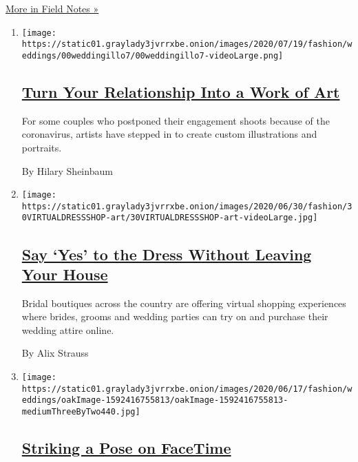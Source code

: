 \href{/column/field-notes}{More in Field Notes »}

\begin{enumerate}
\def\labelenumi{\arabic{enumi}.}
\item
  \texttt{[image: https://static01.graylady3jvrrxbe.onion/images/2020/07/19/fashion/weddings/00weddingillo7/00weddingillo7-videoLarge.png]}

  \hypertarget{turn-your-relationship-into-a-work-of-art}{%
  \subsection{\texorpdfstring{\href{/2020/07/15/fashion/weddings/turn-your-relationship-into-a-work-of-art.html}{Turn
  Your Relationship Into a Work of
  Art}}{Turn Your Relationship Into a Work of Art}}\label{turn-your-relationship-into-a-work-of-art}}

  For some couples who postponed their engagement shoots because of the
  coronavirus, artists have stepped in to create custom illustrations
  and portraits.

  By Hilary Sheinbaum
\item
  \texttt{[image: https://static01.graylady3jvrrxbe.onion/images/2020/06/30/fashion/30VIRTUALDRESSSHOP-art/30VIRTUALDRESSSHOP-art-videoLarge.jpg]}

  \hypertarget{say-yes-to-the-dress-without-leaving-your-house}{%
  \subsection{\texorpdfstring{\href{/2020/06/30/fashion/weddings/say-yes-to-the-dress-without-leaving-your-house.html}{Say
  `Yes' to the Dress Without Leaving Your
  House}}{Say `Yes' to the Dress Without Leaving Your House}}\label{say-yes-to-the-dress-without-leaving-your-house}}

  Bridal boutiques across the country are offering virtual shopping
  experiences where brides, grooms and wedding parties can try on and
  purchase their wedding attire online.

  By Alix Strauss
\item
  \texttt{[image: https://static01.graylady3jvrrxbe.onion/images/2020/06/17/fashion/weddings/oakImage-1592416755813/oakImage-1592416755813-mediumThreeByTwo440.jpg]}

  \hypertarget{striking-a-pose-on-facetime}{%
  \subsection{\texorpdfstring{\href{/2020/06/18/fashion/weddings/striking-a-pose-on-facetime.html}{Striking
  a Pose on
  FaceTime}}{Striking a Pose on FaceTime}}\label{striking-a-pose-on-facetime}}


\end{enumerate}
